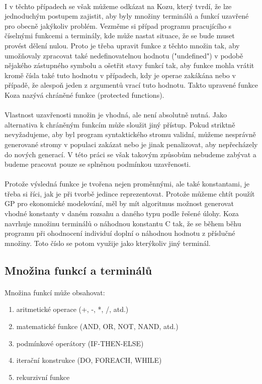 \documentclass[bc,male,java,dept460]{diploma}		%
\begin{document}
\paragraph*{}
I v těchto případech se však můžeme odkázat na Kozu, který tvrdí, že lze jednoduchým postupem zajistit, aby byly množiny terminálů a funkcí uzavřené pro obecně jakýkoliv problém. Vezměme si případ programu pracujícího s číselnými funkcemi a terminály, kde může nastat situace, že se bude muset provést dělení nulou. Proto je třeba upravit funkce z těchto množin tak, aby umožňovaly zpracovat také nedefinovatelnou hodnotu ("undefined") v podobě nějakého zástupného symbolu a ošetřit stavy funkcí tak, aby funkce mohla vrátit kromě čísla také tuto hodnotu v případech, kdy je operae zakákána nebo v případě, že alespoň jeden z argumentů vrací tuto hodnotu. Takto upravené funkce Koza nazývá chráněné funkce (protected functions).

\paragraph*{}
Vlastnost uzavřenosti množin je vhodná, ale není absolutně nutná. Jako alternativa k chráněným funkcím může sloužit jiný přístup. Pokud striktně nevyžadujeme, aby byl program syntaktického stromu validní, můžeme nesprávně generované stromy v populaci zakázat nebo je jinak penalizovat, aby nepřecházely do nových generací. V této práci se však takovým způsobům nebudeme zabývat a budeme pracovat pouze se splněnou podmínkou uzavřenosti.

\paragraph*{}
Protože výsledná funkce je tvořena nejen proměnnými, ale také konstantami, je třeba si říci, jak je při tvorbě jedince reprezentovat. Protože můžeme chtít použít GP pro ekonomické modelování, měl by mít algoritmus možnost generovat vhodné konstanty v daném rozsahu a daného typu podle řešené úlohy. Koza navrhuje množinu terminálů o náhodnou konstantu C tak, že se během běhu programu při ohodnocení individuí doplní o náhodnou hodnotu z příslučné množiny. Toto číslo se potom využije jako kterýkoliv jiný terminál.

\subsection{Množina funkcí a terminálů}
\paragraph*{}
Množina funkcí může obsahovat:
\begin{enumerate}
\item aritmetické operace (+, -, *, /, atd.)
\item matematické funkce (AND, OR, NOT, NAND, atd.)
\item podmínkové operátory (IF-THEN-ELSE)
\item iterační konstrukce (DO, FOREACH, WHILE)
\item rekurzivní funkce
\end{enumerate}
\end{document}
